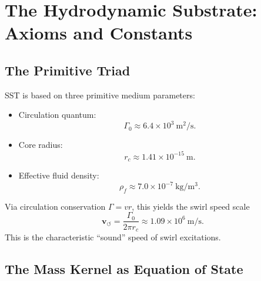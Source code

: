 \documentclass[11pt]{article}
\newcommand{\rhof}{\rho_{\!f}} \newcommand{\rhoF}{\rho_{\!f}}                             %
\newcommand{\rc}{r_c}                                    %
\begin{document}
    \section{The Hydrodynamic Substrate: Axioms and Constants}

        \subsection{The Primitive Triad}

            SST is based on three primitive medium parameters:
            \begin{itemize}
                \item Circulation quantum:
                \begin{equation}
                    \Gamma_0 \approx 6.4 \times 10^3 \ \mathrm{m^2/s}.
                \end{equation}

                \item Core radius:
                \begin{equation}
                    \rc \approx 1.41 \times 10^{-15} \ \mathrm{m}.
                \end{equation}

                \item Effective fluid density:
                \begin{equation}
                    \rhof \approx 7.0 \times 10^{-7} \ \mathrm{kg/m^3}.
                \end{equation}
            \end{itemize}

            Via circulation conservation $\Gamma = v r$, this yields the swirl speed scale
            \begin{equation}
                \mathbf{v}_{\scriptscriptstyle\boldsymbol{\circlearrowleft}} = \frac{\Gamma_0}{2\pi \rc}
                \approx 1.09 \times 10^6 \ \mathrm{m/s}.
            \end{equation}
            This is the characteristic ``sound'' speed of swirl excitations.

        \subsection{The Mass Kernel as Equation of State}
\end{document}
